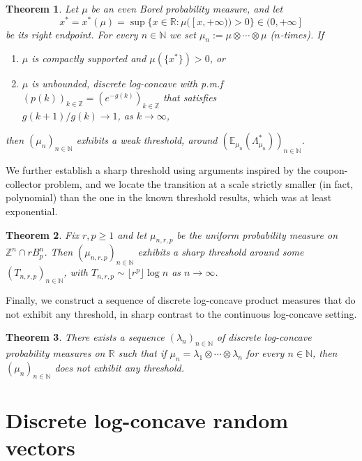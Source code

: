 \documentclass[11pt,a4paper]{article} %
\newtheorem{theorem}{Theorem}[section]
\theoremstyle{definition}
\theoremstyle{remark}
\newcommand{\1}{\mathds{1}}
\begin{document}
\begin{theorem}
    Let $\mu$ be an even  Borel  probability measure, and let $$x^\ast=x^\ast(\mu)=\sup \{ x \in \mathbb{R}: \mu([x,+\infty))>0\} \in (0,+\infty]$$ be its right endpoint. For every $n \in \mathbb{N}$ we set $\mu_n:=\mu\otimes\cdots\otimes\mu$ ($n$-times). If 
    \begin{enumerate}
       \item[{\rm (i)}] $\mu$ is compactly supported and $\mu(\{x^\ast\})>0$, or
       \item[{\rm (ii)}] $\mu$ is unbounded, discrete log-concave with p.m.f $(p(k))_{k \in \mathbb{Z}}=(e^{-g(k)})_{k \in \mathbb{Z}}$ that satisfies\\ $g(k+1)/g(k) \to 1$, as $ k \to \infty$,
\end{enumerate}
then $(\mu_n)_{n \in \mathbb{N}}$ exhibits a weak threshold, around $({\mathbb E}_{\mu_n}(\Lambda_{\mu_n}^{\ast}))_{n \in \mathbb{N}}$.
\end{theorem}

We further establish a sharp threshold using arguments inspired by the coupon-collector problem, and we locate the transition at a scale strictly smaller (in fact, polynomial) than the one in the known threshold results, which was  at least exponential.

\begin{theorem}\label{thm:lattice-ball-threshold}
Fix $r,p \geq 1$ and let $\mu_{n,r,p}$ be the uniform probability measure on $\mathbb{Z}^n \cap rB_p^n$. Then $(\mu_{n,r,p})_{n \in \mathbb{N}}$ exhibits a sharp threshold around some $(T_{n,r,p})_{n \in \mathbb{N}}$, with $T_{n,r,p} \sim \lfloor r^p \rfloor \log n$ as $n \to \infty$.
    \end{theorem}

Finally, we construct a sequence of discrete log-concave product measures that do not exhibit any threshold, in sharp contrast to the continuous log-concave setting.

\begin{theorem}
There exists a sequence $(\lambda_n)_{n \in \mathbb{N}}$ of discrete log-concave probability measures on $\mathbb{R}$ such that if $\mu_n= \lambda_1 \otimes\cdots\otimes \lambda_n$ for every $n \in \mathbb{N}$, then  $(\mu_n)_{n \in \mathbb{N}}$ does not exhibit any threshold.
\end{theorem}


\section{Discrete log-concave random vectors}
\end{document}
